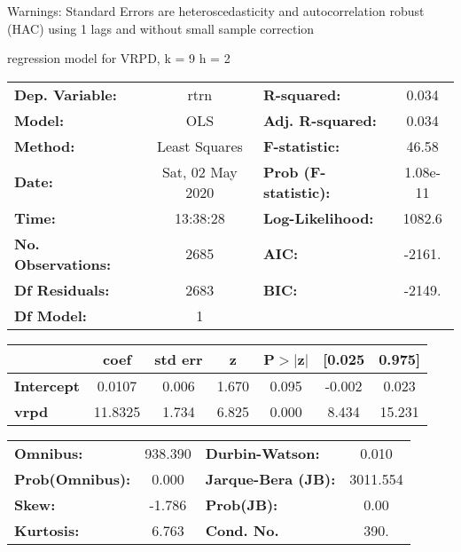 Warnings: \newline
 [1] Standard Errors are heteroscedasticity and autocorrelation robust (HAC) using 1 lags and without small sample correction\ 

regression model for VRPD, k = 9 h = 2\begin{center}
\begin{tabular}{lclc}
\toprule
\textbf{Dep. Variable:}    &       rtrn       & \textbf{  R-squared:         } &     0.034   \\
\textbf{Model:}            &       OLS        & \textbf{  Adj. R-squared:    } &     0.034   \\
\textbf{Method:}           &  Least Squares   & \textbf{  F-statistic:       } &     46.58   \\
\textbf{Date:}             & Sat, 02 May 2020 & \textbf{  Prob (F-statistic):} &  1.08e-11   \\
\textbf{Time:}             &     13:38:28     & \textbf{  Log-Likelihood:    } &    1082.6   \\
\textbf{No. Observations:} &        2685      & \textbf{  AIC:               } &    -2161.   \\
\textbf{Df Residuals:}     &        2683      & \textbf{  BIC:               } &    -2149.   \\
\textbf{Df Model:}         &           1      & \textbf{                     } &             \\
\bottomrule
\end{tabular}
\begin{tabular}{lcccccc}
                   & \textbf{coef} & \textbf{std err} & \textbf{z} & \textbf{P$> |$z$|$} & \textbf{[0.025} & \textbf{0.975]}  \\
\midrule
\textbf{Intercept} &       0.0107  &        0.006     &     1.670  &         0.095        &       -0.002    &        0.023     \\
\textbf{vrpd}      &      11.8325  &        1.734     &     6.825  &         0.000        &        8.434    &       15.231     \\
\bottomrule
\end{tabular}
\begin{tabular}{lclc}
\textbf{Omnibus:}       & 938.390 & \textbf{  Durbin-Watson:     } &    0.010  \\
\textbf{Prob(Omnibus):} &   0.000 & \textbf{  Jarque-Bera (JB):  } & 3011.554  \\
\textbf{Skew:}          &  -1.786 & \textbf{  Prob(JB):          } &     0.00  \\
\textbf{Kurtosis:}      &   6.763 & \textbf{  Cond. No.          } &     390.  \\
\bottomrule
\end{tabular}
\end{center}

